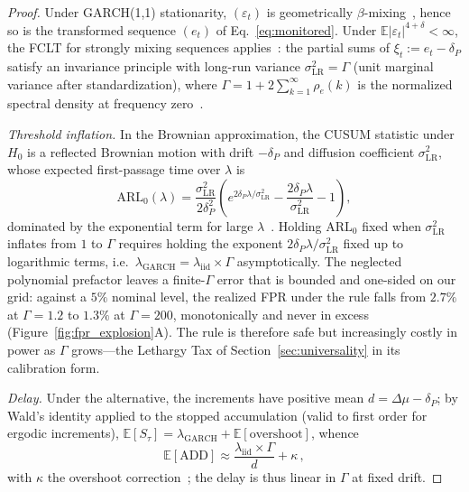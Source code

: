 \documentclass[sigconf,anonymous,review]{acmart}
\theoremstyle{acmdefinition}
\begin{document}
\begin{proof}
    Under GARCH(1,1) stationarity, $(\varepsilon_t)$ is geometrically $\beta$-mixing~\cite{carrasco_mixing_2002}, hence so is the transformed sequence $(e_t)$ of Eq.~\eqref{eq:monitored}.
    Under $\mathbb{E}|\varepsilon_t|^{4+\delta} < \infty$, the FCLT for strongly mixing sequences applies~\cite{herrndorf_1984, merlevede_2006}: the partial sums of $\xi_t := e_t - \delta_P$ satisfy an invariance principle with long-run variance $\sigma^2_{\mathrm{LR}} = \Gamma$ (unit marginal variance after standardization), where $\Gamma = 1 + 2\sum_{k=1}^{\infty}\rho_e(k)$ is the normalized spectral density at frequency zero~\cite{newey_west_1987}.

    \emph{Threshold inflation.}
    In the Brownian approximation, the CUSUM statistic under $H_0$ is a reflected Brownian motion with drift $-\delta_P$ and diffusion coefficient $\sigma^2_{\mathrm{LR}}$, whose expected first-passage time over $\lambda$ is
    \[
        \mathrm{ARL}_0(\lambda) = \frac{\sigma^2_{\mathrm{LR}}}{2\delta_P^2}\left( e^{2\delta_P\lambda/\sigma^2_{\mathrm{LR}}} - \frac{2\delta_P\lambda}{\sigma^2_{\mathrm{LR}}} - 1 \right),
    \]
    dominated by the exponential term for large $\lambda$~\cite{siegmund_1985, tartakovsky_2014}.
    Holding $\mathrm{ARL}_0$ fixed when $\sigma^2_{\mathrm{LR}}$ inflates from $1$ to $\Gamma$ requires holding the exponent $2\delta_P\lambda/\sigma^2_{\mathrm{LR}}$ fixed up to logarithmic terms, i.e.\ $\lambda_{\mathrm{GARCH}} = \lambda_{\mathrm{iid}} \times \Gamma$ asymptotically.
    The neglected polynomial prefactor leaves a finite-$\Gamma$ error that is bounded and one-sided on our grid: against a $5\%$ nominal level, the realized FPR under the rule falls from $2.7\%$ at $\Gamma = 1.2$ to $1.3\%$ at $\Gamma = 200$, monotonically and never in excess (Figure~\ref{fig:fpr_explosion}A).
    The rule is therefore safe but increasingly costly in power as $\Gamma$ grows---the Lethargy Tax of Section~\ref{sec:universality} in its calibration form.

    \emph{Delay.}
    Under the alternative, the increments have positive mean $d = \Delta\mu - \delta_P$; by Wald's identity applied to the stopped accumulation (valid to first order for ergodic increments), $\mathbb{E}[S_\tau] = \lambda_{\mathrm{GARCH}} + \mathbb{E}[\mathrm{overshoot}]$, whence
    \[
        \mathbb{E}[\mathrm{ADD}] \approx \frac{\lambda_{\mathrm{iid}} \times \Gamma}{d} + \kappa\,,
    \]
    with $\kappa$ the overshoot correction~\cite{siegmund_1985}; the delay is thus linear in $\Gamma$ at fixed drift.
\end{proof}
\end{document}
